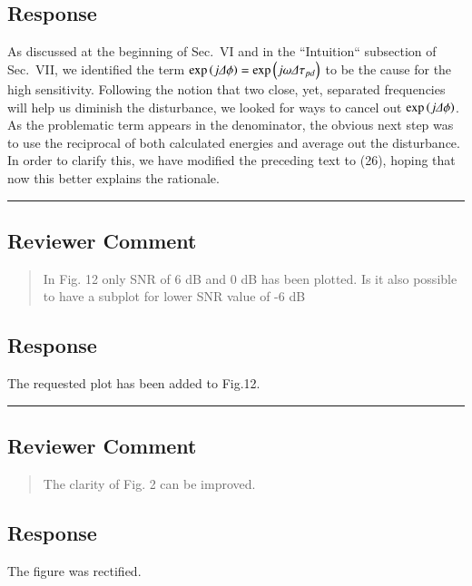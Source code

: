\subsection{Response} 
As discussed at the beginning of Sec.~VI and in the ``Intuition`` subsection of Sec.~VII, we identified the term $\exp\Brack{j\dPhi}=\exp\Brack{j\omega\Delta\tau_{pd}}$ to be the cause for the high sensitivity. Following the notion that two close, yet, separated frequencies will help us diminish the disturbance, we looked for ways to cancel out $\exp\Brack{j\dPhi}$. As the problematic term appears in the denominator, the obvious next step was to use the reciprocal of both calculated energies and average out the disturbance. In order to clarify this, we have modified the preceding text to (26), hoping that now this better explains the rationale. 

\noindent\rule{17cm}{2.0pt}

\subsection{Reviewer Comment}
\begin{mdframed}
\begin{quote}
In Fig. 12 only SNR of 6 dB and 0 dB has been plotted. Is it also possible to have a subplot for lower SNR value of -6 dB
\end{quote}
\end{mdframed}

\subsection{Response} 
The requested plot has been added to Fig.12. 

\noindent\rule{17cm}{2.0pt}

\subsection{Reviewer Comment}
\begin{mdframed}
\begin{quote}
The clarity of Fig. 2 can be improved.
\end{quote}
\end{mdframed}

\subsection{Response} 
The figure was rectified.


